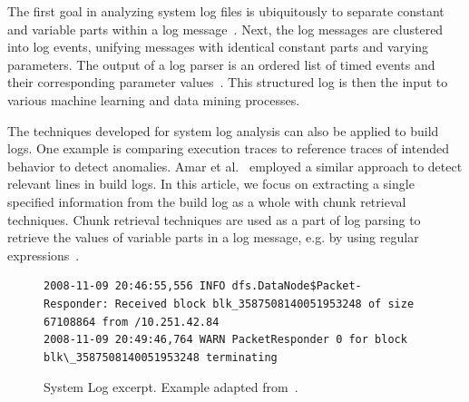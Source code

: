 The first goal in analyzing system log files is ubiquitously to separate constant and variable parts within a log message~\cite{nagappan2010abstracting,he2017towards}.
Next, the log messages are clustered into log events, unifying messages with identical constant parts and varying parameters.
The output of a log parser is an ordered list of timed events and their corresponding parameter values~\cite{he2016evaluation}.
This structured log is then the input to various machine learning and data mining processes.

The techniques developed for system log analysis can also be applied to build logs.
One example is comparing execution traces to reference traces of intended behavior to detect anomalies.
Amar et al.~\cite{amar2019mining} employed a similar approach to detect relevant lines in build logs.
In this article, we focus on extracting a single specified information from the build log as a whole with chunk retrieval techniques.
Chunk retrieval techniques are used as a part of log parsing to retrieve the values of variable parts in a log message, e.g. by using regular expressions~\cite{nagappan2010abstracting,xu2009detecting}.

\begin{figure}[!t]
  \centering
  \begin{lstlisting}[breaklines=true]
2008-11-09 20:46:55,556 INFO dfs.DataNode$Packet- Responder: Received block blk_3587508140051953248 of size 67108864 from /10.251.42.84
2008-11-09 20:49:46,764 WARN PacketResponder 0 for block blk\_3587508140051953248 terminating
  \end{lstlisting}  
  \caption{System Log excerpt. Example adapted from~\cite{he2017towards}.}
  \label{lst:system-log}
\end{figure}


